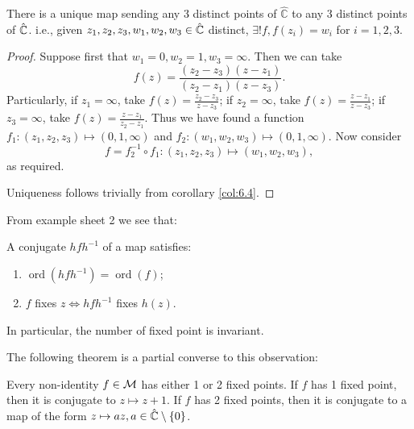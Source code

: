 \documentclass[10pt]{article}
\DeclareMathOperator{\ord}{ord}
\begin{document}
      \begin{theorem}\label{thm:6.5}
          There is a unique \mobius map sending any 3 distinct points of $ \hat{\mathbb{C}} $ to any 3 distinct points of $ \hat{{\mathbb{C}}} $. i.e., given $ z_1,z_2,z_3, w_1,w_2,w_3\in \hat{{\mathbb{C}}} $ distinct, $ \exists ! f, f(z_i)=w_i $ for $i=1,2,3$.
      \end{theorem}
      \begin{proof}
          Suppose first that $w_1=0,w_2=1,w_3 = \infty $. Then we can take
          \[
              f(z)=\frac{(z_2-z_3)(z-z_1)}{(z_2-z_1)(z-z_3)}.
          \]
          Particularly, if $z_1=\infty$, take $ f(z)=\frac{z_2-z_3}{z-z_3} $; if $z_2=\infty$, take $ f(z)=\frac{z-z_1}{z-z_3} $; if $z_3=\infty$, take $ f(z)=\frac{z-z_1}{z_2-z_1} $. Thus we have found a function $ f_1: (z_1,z_2,z_3) \mapsto (0,1, \infty ) $ and $ f_2:(w_1,w_2,w_3)\mapsto (0,1,\infty ) $. Now consider 
          \[
              f = f_2^{-1}\circ f_1: (z_1,z_2,z_3)\mapsto (w_1,w_2,w_3),
          \]
          as required.

          Uniqueness follows trivially from corollary \ref{col:6.4}.
      \end{proof}
      From example sheet 2 we see that:
      \begin{proposition}\label{prop:egsheet2}
          A conjugate $ hfh^{-1} $ of a \mobius map satisfies:
          \begin{enumerate}
              \item $ \ord(hfh^{-1})=\ord(f) $;
              \item $f$ fixes $z \Leftrightarrow hfh^{-1}$ fixes $h(z)$.
          \end{enumerate}
          In particular, the number of fixed point is invariant.
      \end{proposition}
      The following theorem is a partial converse to this observation:
      \begin{theorem}\label{thm:6.6}
          Every non-identity $f\in {\mathcal{M}}$ has either 1 or 2 fixed points. If $f$ has 1 fixed point, then it is conjugate to $ z \mapsto z+1 $. If $f$ has 2 fixed points, then it is conjugate to a map of the form $ z \mapsto az, a\in \hat{{\mathbb{C}}}\setminus \{0\} $.
      \end{theorem}
\end{document}
